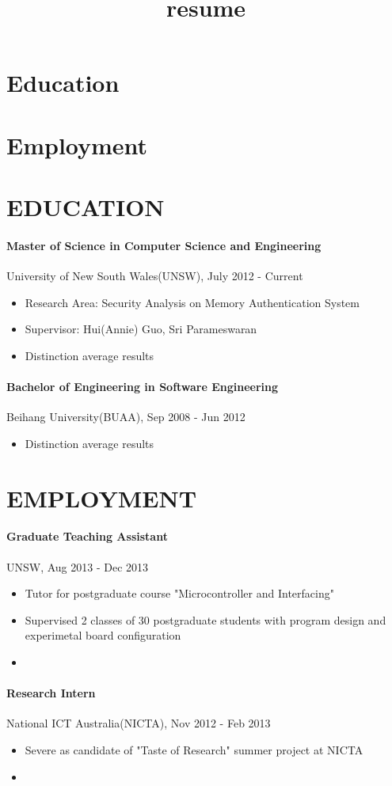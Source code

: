 \documentclass{article}
\begin{document}
\title{resume}
\section{Education}
\section{Employment}
\section{EDUCATION}
\paragraph{Master of Science in Computer Science and Engineering}
University of New South Wales(UNSW), July 2012 - Current
\begin{itemize}
	\item Research Area: Security Analysis on Memory Authentication System
	\item Supervisor: Hui(Annie) Guo, Sri Parameswaran
	\item Distinction average results
\end{itemize}
\paragraph{Bachelor of Engineering in Software Engineering}
Beihang University(BUAA), Sep 2008 - Jun 2012
\begin{itemize}
	\item Distinction average results
\end{itemize}	
\section{EMPLOYMENT}
\paragraph{Graduate Teaching Assistant}
UNSW, Aug 2013 - Dec 2013
\begin{itemize}
	\item Tutor for postgraduate course "Microcontroller and Interfacing"
	\item Supervised 2 classes of 30 postgraduate students with program design and experimetal board configuration
	\item 
\end{itemize}
\paragraph{Research Intern}
National ICT Australia(NICTA), Nov 2012 - Feb 2013
\begin{itemize}
	\item Severe as candidate of "Taste of Research" summer project at NICTA
	\item 
\end{itemize}
\end{document}
